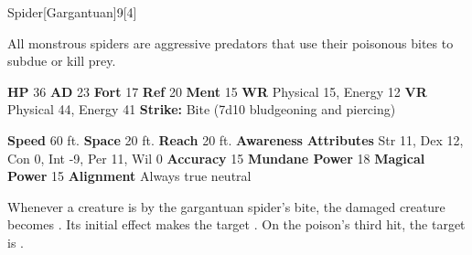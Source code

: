   \begin{monsection}{Spider}[Gargantuan]{9}[4]
    \vspace{-1em}\vspace{-1em}
    \vspace{0em}

    
    All monstrous spiders are aggressive predators that use their poisonous bites to subdue or kill prey.
  
    

    \begin{spellcontent}
      \begin{spelltargetinginfo}
        \pari \textbf{HP} 36 \monsep
          \textbf{AD} 23 \monsep
          \textbf{Fort} 17 \monsep
          \textbf{Ref} 20 \monsep
          \textbf{Ment} 15
        \pari \textbf{WR} Physical 15, Energy 12 \monsep
        \textbf{VR} Physical 44, Energy 41
        \pari \textbf{Strike:}
            Bite  (7d10 bludgeoning and piercing)
      \end{spelltargetinginfo}
    \end{spellcontent}
    \begin{monsterfooter}
      \pari \textbf{Speed} 60 ft. \monsep
        \textbf{Space} 20 ft. \monsep
        \textbf{Reach} 20 ft.
      \pari \textbf{Awareness} 
      \pari \textbf{Attributes}
        Str 11, Dex 12,
        Con 0, Int -9,
        Per 11, Wil 0
      \pari \textbf{Accuracy} 15 \monsep
        \textbf{Mundane Power} 18 \monsep
      \textbf{Magical Power} 15
      \pari \textbf{Alignment} Always true neutral
    \end{monsterfooter}
  \end{monsection}
    Whenever a creature is  by the gargantuan spider's bite,
      the damaged creature becomes .
    Its initial effect makes the target .
    On the poison's third hit, the target is .
  
